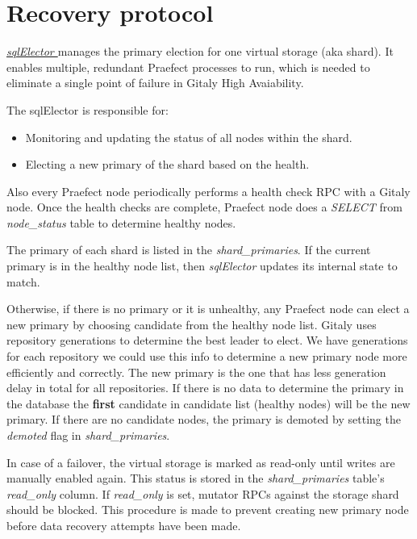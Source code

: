 \documentclass[acmlarge, screen, nonacm]{acmart}
\begin{document}
\section{Recovery protocol}


\emph{\href{https://gitlab.com/gitlab-org/gitaly/-/blob/master/internal/praefect/nodes/sql_elector.go}{sqlElector }}manages the primary election for one virtual storage (aka
shard). It enables multiple, redundant Praefect processes to run,
which is needed to eliminate a single point of failure in Gitaly High
Avaiability.

The sqlElector is responsible for:
\begin{itemize}
\item Monitoring and updating the status of all nodes within the shard.
\item Electing a new primary of the shard based on the health.
\end{itemize}
Also every Praefect node periodically performs a health check RPC with a Gitaly node.  Once the health checks are complete, 
Praefect node does a \textit{SELECT} from \textit{node\_status} table to determine healthy nodes.

The primary of each shard is listed in the
\textit{shard\_primaries}. If the current primary is in the healthy
node list, then \textit{sqlElector} updates its internal state to match.

Otherwise, if there is no primary or it is unhealthy, any Praefect node
can elect a new primary by choosing candidate from the healthy node
list. Gitaly uses repository generations to determine the best leader to elect.  
We have generations for each repository we could use this info to determine a new primary node more efficiently and correctly. 
The new primary is the one that has less generation delay in total for all repositories. If there is no data to determine the 
primary in the database the \textbf{first} candidate in candidate list (healthy nodes) will be the new primary.
If there are no candidate nodes, the primary is demoted by setting the \textit{demoted} flag in \textit{shard\_primaries}.

In case of a failover, the virtual storage is marked as read-only until writes are manually enabled
again. This status is stored in the \textit{shard\_primaries} table's \textit{read\_only }column. 
If \textit{read\_only } is set, mutator RPCs against the storage shard should be blocked. This procedure is made 
to prevent creating new primary node before data recovery attempts have been made.
\end{document}
